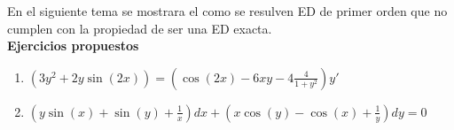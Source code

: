 En el siguiente tema se mostrara el como se resulven ED de primer orden que no cumplen con la propiedad de ser una ED exacta.\\
\textbf{Ejercicios propuestos}
\begin{enumerate}
  \item \(\displaystyle (3y^{2}+2y\sin(2x))=\left(\cos(2x)-6xy-4\frac{4}{1+y^{2}}\right)y'\)
  \item \(\displaystyle \left(y\sin(x)+\sin(y)+\frac{1}{x}\right)dx+\left(x\cos(y)-\cos(x)+\frac{1}{y}\right)dy=0\)
\end{enumerate}